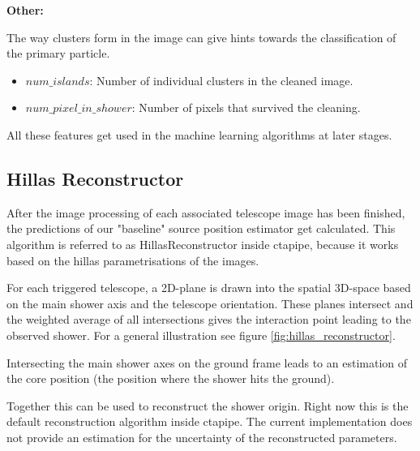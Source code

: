 \textbf{Other:}

The way clusters form in the image can give hints towards the classification of the primary particle.
\begin{itemize}
    \item{$num\_islands$: Number of individual clusters in the cleaned image.}
    \item{$num\_pixel\_in\_shower$: Number of pixels that survived the cleaning.}
\end{itemize}

All these features get used in the machine learning algorithms at later stages.

\subsection{Hillas Reconstructor}  %
After the image processing of each associated telescope image has been finished,
the predictions of our "baseline" source position estimator get calculated.
This algorithm is referred to as HillasReconstructor inside ctapipe, because 
it works based on the hillas parametrisations of the images.

For each triggered telescope, a 2D-plane is drawn into the spatial 3D-space based on the main shower 
axis and the telescope orientation. These planes intersect and 
the weighted average of all intersections gives the 
interaction point leading to the observed shower.
For a general illustration see figure \ref{fig:hillas_reconstructor}.

Intersecting the main shower axes on the ground frame leads to 
an estimation of the core position (the position where the 
shower hits the ground).

Together this can be used to reconstruct the shower origin.
Right now this is the default reconstruction algorithm inside ctapipe.
The current implementation does not provide an 
estimation for the uncertainty of the reconstructed parameters.

